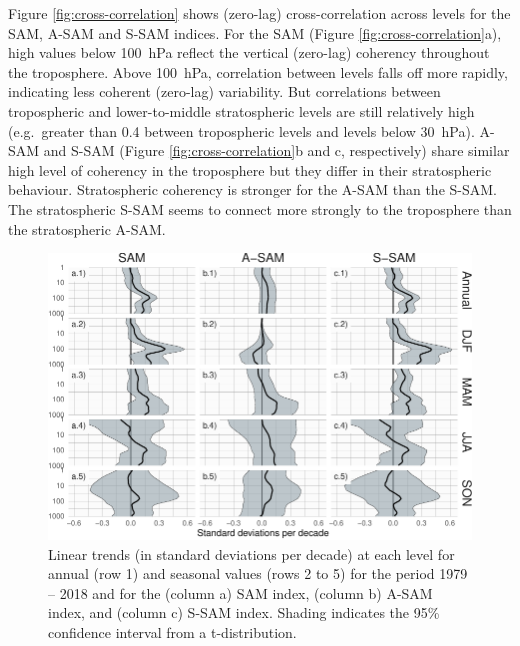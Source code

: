 \documentclass[smallextended]{svjour3}       %
\begin{document}
Figure \ref{fig:cross-correlation} shows (zero-lag) cross-correlation across levels for the SAM, A\nobreakdash-SAM and S\nobreakdash-SAM indices.
For the SAM (Figure \ref{fig:cross-correlation}a), high values below 100~hPa reflect the vertical (zero-lag) coherency throughout the troposphere.
Above 100~hPa, correlation between levels falls off more rapidly, indicating less coherent (zero-lag) variability.
But correlations between tropospheric and lower-to-middle stratospheric levels are still relatively high (e.g.~greater than 0.4 between tropospheric levels and levels below 30~hPa).
A\nobreakdash-SAM and S\nobreakdash-SAM (Figure \ref{fig:cross-correlation}b and c, respectively) share similar high level of coherency in the troposphere but they differ in their stratospheric behaviour.
Stratospheric coherency is stronger for the A\nobreakdash-SAM than the S\nobreakdash-SAM.
The stratospheric S\nobreakdash-SAM seems to connect more strongly to the troposphere than the stratospheric A\nobreakdash-SAM.

\begin{figure}
\includegraphics{trends-1} \caption{Linear trends (in standard deviations per decade) at each level for annual (row 1) and seasonal values (rows 2 to 5) for the period 1979 -- 2018 and for the (column a) SAM index, (column b) A\nobreakdash-SAM index, and (column c) S\nobreakdash-SAM index. Shading indicates the 95\% confidence interval from a t-distribution.}\label{fig:trends}
\end{figure}
\end{document}
